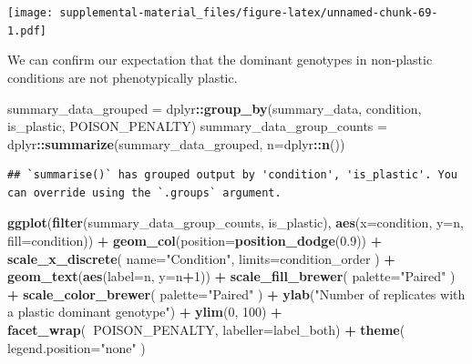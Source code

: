 \documentclass[]{book}
\newenvironment{Shaded}{\begin{snugshade}}{\end{snugshade}}
\newcommand{\DataTypeTok}[1]{\textcolor[rgb]{0.13,0.29,0.53}{#1}}
\newcommand{\DecValTok}[1]{\textcolor[rgb]{0.00,0.00,0.81}{#1}}
\newcommand{\FloatTok}[1]{\textcolor[rgb]{0.00,0.00,0.81}{#1}}
\newcommand{\KeywordTok}[1]{\textcolor[rgb]{0.13,0.29,0.53}{\textbf{#1}}}
\newcommand{\NormalTok}[1]{#1}
\newcommand{\OperatorTok}[1]{\textcolor[rgb]{0.81,0.36,0.00}{\textbf{#1}}}
\newcommand{\StringTok}[1]{\textcolor[rgb]{0.31,0.60,0.02}{#1}}
\begin{document}
\texttt{[image: supplemental-material\_files/figure-latex/unnamed-chunk-69-1.pdf]}

We can confirm our expectation that the dominant genotypes in non-plastic conditions are not phenotypically plastic.

\begin{Shaded}
\begin{Highlighting}[]
\NormalTok{summary_data_grouped =}\StringTok{ }\NormalTok{dplyr}\OperatorTok{::}\KeywordTok{group_by}\NormalTok{(summary_data, condition, is_plastic, POISON_PENALTY)}
\NormalTok{summary_data_group_counts =}\StringTok{ }\NormalTok{dplyr}\OperatorTok{::}\KeywordTok{summarize}\NormalTok{(summary_data_grouped, }\DataTypeTok{n=}\NormalTok{dplyr}\OperatorTok{::}\KeywordTok{n}\NormalTok{())}
\end{Highlighting}
\end{Shaded}

\begin{verbatim}
## `summarise()` has grouped output by 'condition', 'is_plastic'. You can override using the `.groups` argument.
\end{verbatim}

\begin{Shaded}
\begin{Highlighting}[]
\KeywordTok{ggplot}\NormalTok{(}\KeywordTok{filter}\NormalTok{(summary_data_group_counts, is_plastic), }\KeywordTok{aes}\NormalTok{(}\DataTypeTok{x=}\NormalTok{condition, }\DataTypeTok{y=}\NormalTok{n, }\DataTypeTok{fill=}\NormalTok{condition)) }\OperatorTok{+}
\StringTok{  }\KeywordTok{geom_col}\NormalTok{(}\DataTypeTok{position=}\KeywordTok{position_dodge}\NormalTok{(}\FloatTok{0.9}\NormalTok{)) }\OperatorTok{+}
\StringTok{  }\KeywordTok{scale_x_discrete}\NormalTok{(}
    \DataTypeTok{name=}\StringTok{"Condition"}\NormalTok{,}
    \DataTypeTok{limits=}\NormalTok{condition_order}
\NormalTok{  ) }\OperatorTok{+}
\StringTok{  }\KeywordTok{geom_text}\NormalTok{(}\KeywordTok{aes}\NormalTok{(}\DataTypeTok{label=}\NormalTok{n, }\DataTypeTok{y=}\NormalTok{n}\OperatorTok{+}\DecValTok{1}\NormalTok{)) }\OperatorTok{+}
\StringTok{  }\KeywordTok{scale_fill_brewer}\NormalTok{(}
    \DataTypeTok{palette=}\StringTok{"Paired"}
\NormalTok{  ) }\OperatorTok{+}
\StringTok{  }\KeywordTok{scale_color_brewer}\NormalTok{(}
    \DataTypeTok{palette=}\StringTok{"Paired"}
\NormalTok{  ) }\OperatorTok{+}
\StringTok{  }\KeywordTok{ylab}\NormalTok{(}\StringTok{"Number of replicates with a plastic dominant genotype"}\NormalTok{) }\OperatorTok{+}
\StringTok{  }\KeywordTok{ylim}\NormalTok{(}\DecValTok{0}\NormalTok{, }\DecValTok{100}\NormalTok{) }\OperatorTok{+}
\StringTok{  }\KeywordTok{facet_wrap}\NormalTok{(}\OperatorTok{~}\NormalTok{POISON_PENALTY, }\DataTypeTok{labeller=}\NormalTok{label_both) }\OperatorTok{+}
\StringTok{  }\KeywordTok{theme}\NormalTok{(}
    \DataTypeTok{legend.position=}\StringTok{"none"}
\NormalTok{  )}
\end{Highlighting}
\end{Shaded}
\end{document}
